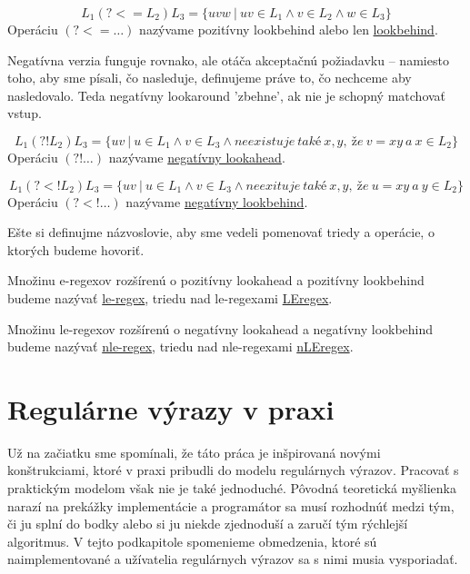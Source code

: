\begin{df}
$$ L_{1}(?<=L_{2})L_{3} = \lbrace uvw ~|~ uv \in L_{1} \land v \in L_{2} \land w \in L_{3} \rbrace $$ Operáciu $(?<=\dots)$ nazývame pozitívny lookbehind alebo len \underline{lookbehind}.
\end{df}

Negatívna verzia funguje rovnako, ale otáča akceptačnú požiadavku -- namiesto toho, aby sme písali, čo nasleduje, definujeme práve to, čo nechceme aby nasledovalo. Teda negatívny lookaround 'zbehne', ak nie je schopný matchovať vstup.

\begin{df}
$$ L_{1}(?!L_{2})L_{3} = \lbrace uv ~|~ u \in L_{1} \land v \in L_{3} \land neexistuje~také~x,y,~že~v=xy~a~x \in L_2 \rbrace $$ Operáciu $(?!\dots)$ nazývame \underline{negatívny lookahead}.
\end{df}

\begin{df}
$$ L_{1}(?<!L_{2})L_{3} = \lbrace uv ~|~ u \in L_{1} \land v \in L_{3} \land neexituje~také~x,y,~že~u=xy~a~y \in L_2 \rbrace $$ Operáciu $(?<!\dots)$ nazývame \underline{negatívny lookbehind}.
\end{df}

Ešte si definujme názvoslovie, aby sme vedeli pomenovať triedy a operácie, o ktorých budeme hovoriť.

\begin{df}
Množinu e-regexov rozšírenú o pozitívny lookahead a pozitívny lookbehind budeme nazývať \underline{le-regex}, triedu nad le-regexami \underline{LEregex}.
\end{df}

\begin{df}
Množinu le-regexov rozšírenú o negatívny lookahead a negatívny lookbehind budeme nazývať \underline{nle-regex}, triedu nad nle-regexami \underline{nLEregex}.
\end{df}

\section[Prax]{Regulárne výrazy v praxi}
\label{prax}

Už na začiatku sme spomínali, že táto práca je inšpirovaná novými konštrukciami, ktoré v praxi pribudli do modelu regulárnych výrazov. Pracovať s praktickým modelom však nie je také jednoduché. Pôvodná teoretická myšlienka narazí na prekážky implementácie a programátor sa musí rozhodnúť medzi tým, či ju splní do bodky alebo si ju niekde zjednoduší a zaručí tým rýchlejší algoritmus. V tejto podkapitole spomenieme obmedzenia, ktoré sú naimplementované a užívatelia regulárnych výrazov sa s nimi musia vysporiadať.


